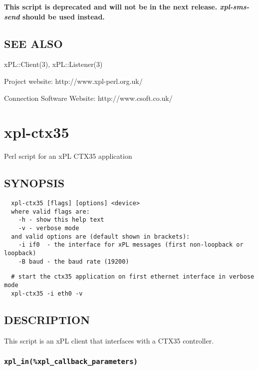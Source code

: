 \documentclass[12pt,a4paper]{article}
\begin{document}
\textbf{This script is deprecated and will not be in the next release.
\emph{xpl-sms-send} should be used instead.}

\subsection*{SEE ALSO\label{xpl-csoft-sms_SEE_ALSO}}


xPL::Client(3), xPL::Listener(3)



Project website: http://www.xpl-perl.org.uk/



Connection Software Website: http://www.csoft.co.uk/

\newpage
\section{xpl-ctx35\label{xpl-ctx35}}


Perl script for an xPL CTX35 application

\subsection*{SYNOPSIS\label{xpl-ctx35_SYNOPSIS}}
\begin{verbatim}
  xpl-ctx35 [flags] [options] <device>
  where valid flags are:
    -h - show this help text
    -v - verbose mode
  and valid options are (default shown in brackets):
    -i if0  - the interface for xPL messages (first non-loopback or loopback)
    -B baud - the baud rate (19200)
\end{verbatim}
\begin{verbatim}
  # start the ctx35 application on first ethernet interface in verbose mode
  xpl-ctx35 -i eth0 -v
\end{verbatim}
\subsection*{DESCRIPTION\label{xpl-ctx35_DESCRIPTION}}


This script is an xPL client that interfaces with a CTX35 controller.

\subsubsection*{\texttt{xpl\_in(\%xpl\_callback\_parameters)}\label{xpl-ctx35_xpl_in_xpl_callback_parameters_}}
\end{document}
